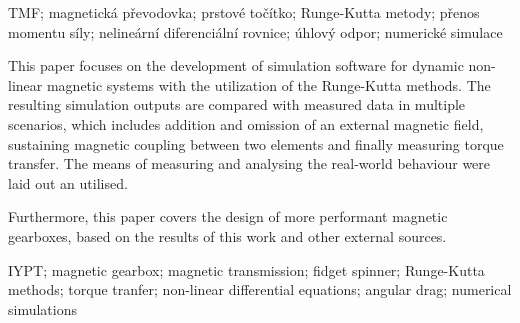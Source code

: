 \documentclass[12pt, a4paper,
 twoside,        %
 openright
]{report}
\begin{document}
\vspace{18pt}


\noindent TMF; magnetická převodovka; prstové točítko; Runge-Kutta metody; přenos momentu síly; nelineární diferenciální rovnice; úhlový odpor; numerické simulace

\vspace{18pt}


\noindent This paper focuses on the development of simulation software for dynamic non-linear magnetic systems with the utilization of the Runge-Kutta methods. The resulting simulation outputs are compared with measured data in multiple scenarios, which includes addition and omission of an external magnetic field, sustaining magnetic coupling between two elements and finally measuring torque transfer. The means of measuring and analysing the real-world behaviour were laid out an utilised.

Furthermore, this paper covers the design of more performant magnetic gearboxes, based on the results of this work and other external sources.

\vspace{18pt}


\noindent IYPT; magnetic gearbox; magnetic transmission; fidget spinner; Runge-Kutta methods; torque tranfer; non-linear differential equations; angular drag; numerical simulations
\cleardoublepage

\setlength{\parskip}{0pt}%

\tableofcontents
\setlength{\parskip}{12pt}%

\pagestyle{fancy}











\end{document}
